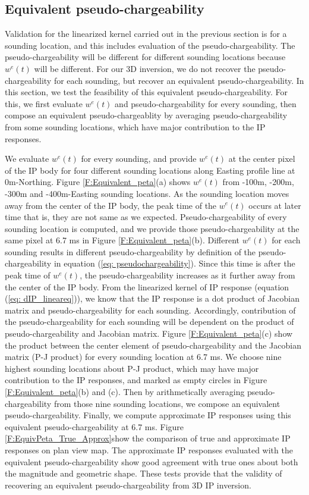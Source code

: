 \documentclass[a4paper, 11pt]{article}
\begin{document}
\subsection{Equivalent pseudo-chargeability}
Validation for the linearized kernel carried out in the previous section is for a sounding location, and this includes evaluation of the pseudo-chargeability. 
The pseudo-chargeability will be different for different sounding locations because $w^e(t)$ will be different. 
For our 3D inversion, we do not recover the pseudo-chargeability for each sounding, but 
recover an equivalent pseudo-chargeability. 
In this section, we test the feasibility of this equivalent pseudo-chargeability. 
For this, we first evaluate $w^e(t)$ and pseudo-chargeability for every sounding, then compose an equivalent pseudo-chargeablity by averaging pseudo-chargeability from some sounding locations, which have major contribution to the IP responses. 

We evaluate $w^e(t)$ for every sounding, and provide $w^e(t)$ at the center pixel of the IP body for four different sounding locations along Easting profile line at 0m-Northing. 
Figure \ref{F:Equivalent_peta}(a) shows $w^e(t)$ from -100m, -200m, -300m and -400m-Easting sounding locations. 
As the sounding location moves away from the center of the IP body, the peak time of the $w^e(t)$ occurs at later time that is, they are not same as we expected. 
Pseudo-chargeability of every sounding location is computed, and we provide those pseudo-chargeability at the same pixel at 6.7 ms in Figure \ref{F:Equivalent_peta}(b). 
Different $w^e(t)$ for each sounding results in different pseudo-chargeability by definition of the pseudo-chargeability in equation (\ref{eq: pseudochargeability}). 
Since this time is after the peak time of $w^e(t)$, the pseudo-chargeability increases as it further away from the center of the IP body. 
From the linearized kernel of IP response (equation (\ref{eq: dIP_lineareq})), we know that the IP response is a dot product of Jacobian matrix and pseudo-chargeability for each sounding. 
Accordingly, contribution of the pseudo-chargeability for each sounding will be dependent on the product of pseudo-chargeability and Jacobian matrix. 
Figure \ref{F:Equivalent_peta}(c) show the product between the center element of pseudo-chargeability and the Jacobian matrix (P-J product) for every sounding location at 6.7 ms. 
We choose nine highest sounding locations about P-J product, which may have major contribution to the IP responses, and marked as empty circles in Figure \ref{F:Equivalent_peta}(b) and (c).
Then by arithmetically averaging pseudo-chargeability from those nine sounding locations, we compose an equivalent pseudo-chargeability. 
Finally, we compute approximate IP responses using this equivalent pseudo-chargeability at 6.7 ms. 
Figure \ref{F:EquivPeta_True_Approx}show the comparison of true and approximate IP responses on plan view map. 
The approximate IP responses evaluated with the equivalent pseudo-chargeability show good agreement with true ones about both the magnitude and geometric shape.
These tests provide that the validity of recovering an equivalent pseudo-chargeability from 3D IP inversion. 
\end{document}
